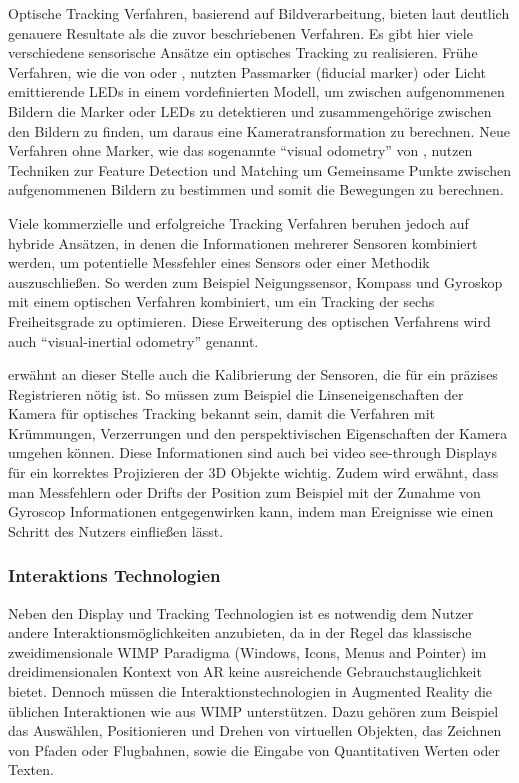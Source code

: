Optische Tracking Verfahren, basierend auf Bildverarbeitung, bieten laut \citet{van2010survey} deutlich genauere Resultate als die zuvor beschriebenen Verfahren. Es gibt hier viele verschiedene sensorische Ansätze ein optisches Tracking zu realisieren. Frühe Verfahren, wie die von \citet{dunston2008identification} oder \citet{narzt2006augmented}, nutzten Passmarker (fiducial marker) oder Licht emittierende LEDs in einem vordefinierten Modell, um zwischen aufgenommenen Bildern die Marker oder LEDs zu detektieren und zusammengehörige zwischen den Bildern zu finden, um daraus eine Kameratransformation zu berechnen. Neue Verfahren ohne Marker, wie das sogenannte \enquote{visual odometry} von \citet{nister2004visual}, nutzen Techniken zur Feature Detection und Matching um Gemeinsame Punkte zwischen aufgenommenen Bildern zu bestimmen und somit die Bewegungen zu berechnen.

Viele kommerzielle und erfolgreiche Tracking Verfahren beruhen jedoch auf hybride Ansätzen, in denen die Informationen mehrerer Sensoren kombiniert werden, um potentielle Messfehler eines Sensors oder einer Methodik auszuschließen. So werden zum Beispiel Neigungssensor, Kompass und Gyroskop mit einem optischen Verfahren kombiniert, um ein Tracking der sechs Freiheitsgrade zu optimieren. Diese Erweiterung des optischen Verfahrens wird auch \enquote{visual-inertial odometry} genannt. \citep{van2010survey}

\citet{azuma2001recent} erwähnt an dieser Stelle auch die Kalibrierung der Sensoren, die für ein präzises Registrieren nötig ist. So müssen zum Beispiel die Linseneigenschaften der Kamera für optisches Tracking bekannt sein, damit die Verfahren mit Krümmungen, Verzerrungen und den perspektivischen Eigenschaften der Kamera umgehen können. Diese Informationen sind auch bei video see-through Displays für ein korrektes Projizieren der 3D Objekte wichtig. Zudem wird erwähnt, dass man Messfehlern oder Drifts der Position zum Beispiel mit der Zunahme von Gyroscop Informationen entgegenwirken kann, indem man Ereignisse wie einen Schritt des Nutzers einfließen lässt. \citep{azuma2001recent} 

\subsubsection{Interaktions Technologien} \label{sec:ar-interaction}

Neben den Display und Tracking Technologien ist es notwendig dem Nutzer andere Interaktionsmöglichkeiten anzubieten, da in der Regel das klassische zweidimensionale WIMP Paradigma (Windows, Icons, Menus and Pointer) im dreidimensionalen Kontext von AR keine ausreichende Gebrauchstauglichkeit bietet. Dennoch müssen die Interaktionstechnologien in Augmented Reality die üblichen Interaktionen wie aus WIMP unterstützen. Dazu gehören zum Beispiel das Auswählen, Positionieren und Drehen von virtuellen Objekten, das Zeichnen von Pfaden oder Flugbahnen, sowie die Eingabe von Quantitativen Werten oder Texten. \citep{van2010survey} 

